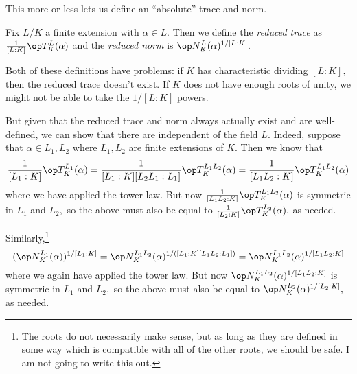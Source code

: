 This more or less lets us define an ``absolute'' trace and norm.
\begin{definition}
	Fix $L/K$ a finite extension with $\alpha\in L.$ Then we define the \textit{reduced trace} as $\frac1{[L:K]}\op T^L_K(\alpha)$ and the \textit{reduced norm} is $\op N^L_K(\alpha)^{1/[L:K]}.$
\end{definition}
Both of these definitions have problems: if $K$ has characteristic dividing $[L:K],$ then the reduced trace doesn't exist. If $K$ does not have enough roots of unity, we might not be able to take the $1/[L:K]$ powers.

But given that the reduced trace and norm always actually exist and are well-defined, we can show that there are independent of the field $L.$ Indeed, suppose that $\alpha\in L_1,L_2$ where $L_1,L_2$ are finite extensions of $K.$ Then we know that
\[\frac1{[L_1:K]}\op T^{L_1}_K(\alpha)=\frac1{[L_1:K][L_2L_1:L_1]}\op T^{L_1L_2}_K(\alpha)=\frac1{[L_1L_2:K]}\op T^{L_1L_2}_K(\alpha)\]
where we have applied the tower law. But now $\frac1{[L_1L_2:K]}\op T^{L_1L_2}_K(\alpha)$ is symmetric in $L_1$ and $L_2,$ so the above must also be equal to $\frac1{[L_2:K]}\op T^{L_2}_K(\alpha),$ as needed.

Similarly,\footnote{The roots do not necessarily make sense, but as long as they are defined in some way which is compatible with all of the other roots, we should be safe. I am not going to write this out.}
\[(\op N^{L_1}_K(\alpha))^{1/[L_1:K]}=\op N^{L_1L_2}_K(\alpha)^{1/([L_1:K][L_1L_2:L_1])}=\op N^{L_1L_2}_K(\alpha)^{1/[L_1L_2:K]}\]
where we again have applied the tower law. But now $\op N^{L_1L_2}_K(\alpha)^{1/[L_1L_2:K]}$ is symmetric in $L_1$ and $L_2,$ so the above must also be equal to $\op N^{L_2}_K(\alpha)^{1/[L_2:K]},$ as needed.

